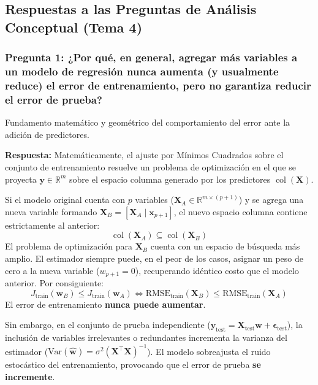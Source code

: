 \documentclass[12pt,a4paper]{article}
\newcommand{\R}{\mathbb{R}}
\newcommand{\col}{\operatorname{col}}
\begin{document}
\newpage
\subsection{Respuestas a las Preguntas de Análisis Conceptual (Tema 4)}

\subsubsection*{Pregunta 1: ¿Por qué, en general, agregar más variables a un modelo de regresión nunca aumenta (y usualmente reduce) el error de entrenamiento, pero no garantiza reducir el error de prueba?}
\begin{pthreeProblem}
Fundamento matemático y geométrico del comportamiento del error ante la adición de predictores.
\end{pthreeProblem}

\textbf{Respuesta:}
Matemáticamente, el ajuste por Mínimos Cuadrados sobre el conjunto de entrenamiento resuelve un problema de optimización en el que se proyecta $\mathbf{y} \in \R^m$ sobre el espacio columna generado por los predictores $\col(\mathbf{X})$. 

Si el modelo original cuenta con $p$ variables ($\mathbf{X}_A \in \R^{m \times (p+1)}$) y se agrega una nueva variable formando $\mathbf{X}_B = [\mathbf{X}_A \mid \mathbf{x}_{p+1}]$, el nuevo espacio columna contiene estrictamente al anterior:
\begin{equation}
  \col(\mathbf{X}_A) \subseteq \col(\mathbf{X}_B)
\end{equation}
El problema de optimización para $\mathbf{X}_B$ cuenta con un espacio de búsqueda más amplio. El estimador siempre puede, en el peor de los casos, asignar un peso de cero a la nueva variable ($w_{p+1} = 0$), recuperando idéntico costo que el modelo anterior. Por consiguiente:
\begin{equation}
  J_{\text{train}}(\mathbf{w}_B) \le J_{\text{train}}(\mathbf{w}_A) \iff \text{RMSE}_{\text{train}}(\mathbf{X}_B) \le \text{RMSE}_{\text{train}}(\mathbf{X}_A)
\end{equation}
El error de entrenamiento \textbf{nunca puede aumentar}. 

Sin embargo, en el conjunto de prueba independiente ($\mathbf{y}_{\text{test}} = \mathbf{X}_{\text{test}}\mathbf{w} + \boldsymbol{\epsilon}_{\text{test}}$), la inclusión de variables irrelevantes o redundantes incrementa la varianza del estimador ($\text{Var}(\hat{\mathbf{w}}) = \sigma^2 (\mathbf{X}^\top \mathbf{X})^{-1}$). El modelo sobreajusta el ruido estocástico del entrenamiento, provocando que el error de prueba \textbf{se incremente}.
\end{document}
